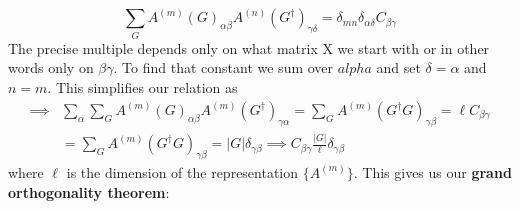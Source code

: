 \documentclass{article}
\begin{document}
	\begin{equation}
		\sum_{G}A^{(m)}(G)_{\alpha \beta}  A^{(n)}(G^\dagger)_{\gamma \delta} = \delta_{mn}\delta_{\alpha \delta} C_{\beta \gamma}
	\end{equation}
	The precise multiple depends only on what matrix X we start with or in other words only on $\beta \gamma$. To find that constant we sum over $alpha$ and set $\delta = \alpha$ and $n = m$. This simplifies our relation as
	\begin{equation}
		\begin{split}
			\implies &\sum_\alpha \sum_{G}A^{(m)}(G)_{\alpha \beta}  A^{(m)}(G^\dagger)_{\gamma \alpha} = \sum_G A^{(m)}(G^\dagger G)_{\gamma \beta} = \ell C_{\beta \gamma}\\
			&=  \sum_G A^{(m)}(G^\dagger G)_{\gamma \beta} = |G| \delta_{\gamma \beta} \implies C_{\beta \gamma} \frac{|G|}{\ell} \delta_{\gamma \beta}
		\end{split}
	\end{equation}
	where $\ell$ is the dimension of the representation $\{A^{(m)}\}$. This gives us our \textbf{grand orthogonality theorem}:
	
\end{document}
